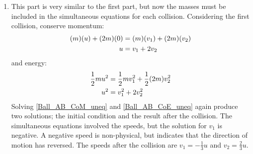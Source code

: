 \begin{hint}[A1969AMIIQ8l]
{\begin{enumerate}
We now have the three velocities:
\begin{align*} v_{1} = 0 && w_{2} = 0 && w_{3} = u \end{align*}
as the final velocities of the three balls.


	\item This part is very similar to the first part, but now the masses must be included in the simultaneous equations for each collision. Considering the first collision, conserve momentum:
\begin{align} \notag (m)(u) + (2m)(0) &= (m)(v_{1}) + (2m)(v_{2}) \\ u &= v_{1} + 2v_{2} \label{Ball_AB_CoM_uneq} \end{align}
and energy:
\begin{align} \notag \frac{1}{2}mu^{2} &= \frac{1}{2}mv_{1}^{2} + \frac{1}{2}(2m)v_{2}^{2} \\ u^{2} &= v_{1}^{2} + 2v_{2}^{2} \label{Ball_AB_CoE_uneq} \end{align}
Solving \eqref{Ball_AB_CoM_uneq} and \eqref{Ball_AB_CoE_uneq} again produce two solutions; the initial condition and the result after the collision. The simultaneous equations involved the speeds, but the solution for $v_{1}$ is negative. A negative speed is non-physical, but indicates that the direction of motion has reversed. The speeds after the collision are $v_{1} = - \frac{1}{3}u$ and $v_{2} = \frac{2}{3}u$.


\end{enumerate}}
\end{hint}
